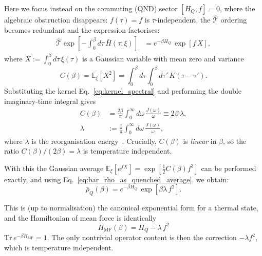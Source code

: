 \documentclass[aps,prl,twocolumn,superscriptaddress,showpacs,floatfix]{revtex4-2}
\newcommand{\Tr}{\mathrm{Tr}}
\begin{document}
Here we focus instead on the commuting (QND) sector $[H_Q,f]=0$, where the algebraic obstruction disappears: $f(\tau)=f$ is $\tau$-independent, the $\hat{\mathcal{T}}$ ordering becomes redundant and the expression factorises:
\begin{align}
    \hat{\mathcal{T}}\exp\!\left[-\int_0^\beta d\tau\,\bar{H}(\tau;\xi)\right]
    &=
    e^{-\beta H_Q}\, \exp\!\left[f\,X\right],
    \label{eq:tilde_rho_commuting_factorised}
\end{align}
where $X:=\int_0^\beta d\tau\,\xi(\tau)$ is a Gaussian variable with mean zero and variance
\begin{equation}
    C(\beta) = \mathbb E_\xi[X^2] = \int_0^\beta d\tau\int_0^\beta d\tau'\,K(\tau-\tau').
    \label{eq:Cbeta_def}
\end{equation}
Substituting the kernel Eq.~\eqref{eq:kernel_spectral} and performing the double
imaginary-time integral gives
\begin{align}
    C(\beta)
    &=\frac{2\beta}{\pi}\int_0^\infty d\omega\,\frac{J(\omega)}{\omega}
    \equiv 2\beta\,\lambda,
    \nonumber\\
    \lambda&:=\frac{1}{\pi}\int_0^\infty d\omega\,\frac{J(\omega)}{\omega},
    \label{eq:Cbeta_explicit}
\end{align}
where $\lambda$ is the reorganisation energy~\cite{weissQuantumDissipativeSystems2012, leggettDynamicsDissipativeTwostate1987}.
Crucially, $C(\beta)$ is \emph{linear} in $\beta$, so the ratio $C(\beta)/(2\beta)=\lambda$ is temperature independent.

With this the Gaussian average $\mathbb E_\xi[e^{f X}] = \exp[\frac{1}{2}C(\beta)f^2]$ can be performed exactly, and using Eq.~\eqref{eq:bar_rho_as_quenched_average}, we obtain:
\begin{equation}
    \bar\rho_Q(\beta) = e^{-\beta H_Q}\,\exp\!\left[\beta\lambda\,f^2\right].
    \label{eq:bar_rho_commuting_closed}
\end{equation}

This is (up to normalisation) the canonical exponential form for a thermal state, and the Hamiltonian of mean force is identically
\begin{equation}
    H_{\mathrm{MF}}(\beta) = H_Q -\lambda\,f^2 
    \label{eq:HMF_commuting_final}
\end{equation}
$\Tr\,e^{-\beta H_{\mathrm{MF}}}=1$. The only nontrivial operator content is then the correction $-\lambda f^2$, which is temperature independent.
\end{document}
